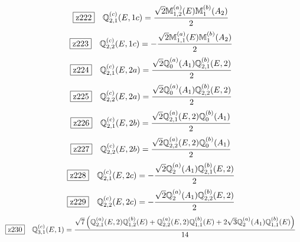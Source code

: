 \documentclass[fleqn,10pt,landscape]{jsarticle}
\begin{document}
\begin{dmath*}
\hspace*{3mm}\fbox{z222}\quad \mathbb{Q}_{2,1}^{(c)}(E,1c)=\frac{\sqrt{2} \mathbb{M}_{1,2}^{(a)}(E) \mathbb{M}_{1}^{(b)}(A_{2})}{2}
\end{dmath*}
\begin{dmath*}
\hspace*{3mm}\fbox{z223}\quad \mathbb{Q}_{2,2}^{(c)}(E,1c)=- \frac{\sqrt{2} \mathbb{M}_{1,1}^{(a)}(E) \mathbb{M}_{1}^{(b)}(A_{2})}{2}
\end{dmath*}
\begin{dmath*}
\hspace*{3mm}\fbox{z224}\quad \mathbb{Q}_{2,1}^{(c)}(E,2a)=\frac{\sqrt{2} \mathbb{Q}_{0}^{(a)}(A_{1}) \mathbb{Q}_{2,1}^{(b)}(E,2)}{2}
\end{dmath*}
\begin{dmath*}
\hspace*{3mm}\fbox{z225}\quad \mathbb{Q}_{2,2}^{(c)}(E,2a)=\frac{\sqrt{2} \mathbb{Q}_{0}^{(a)}(A_{1}) \mathbb{Q}_{2,2}^{(b)}(E,2)}{2}
\end{dmath*}
\begin{dmath*}
\hspace*{3mm}\fbox{z226}\quad \mathbb{Q}_{2,1}^{(c)}(E,2b)=\frac{\sqrt{2} \mathbb{Q}_{2,1}^{(a)}(E,2) \mathbb{Q}_{0}^{(b)}(A_{1})}{2}
\end{dmath*}
\begin{dmath*}
\hspace*{3mm}\fbox{z227}\quad \mathbb{Q}_{2,2}^{(c)}(E,2b)=\frac{\sqrt{2} \mathbb{Q}_{2,2}^{(a)}(E,2) \mathbb{Q}_{0}^{(b)}(A_{1})}{2}
\end{dmath*}
\begin{dmath*}
\hspace*{3mm}\fbox{z228}\quad \mathbb{Q}_{2,1}^{(c)}(E,2c)=- \frac{\sqrt{2} \mathbb{Q}_{2}^{(a)}(A_{1}) \mathbb{Q}_{2,1}^{(b)}(E,2)}{2}
\end{dmath*}
\begin{dmath*}
\hspace*{3mm}\fbox{z229}\quad \mathbb{Q}_{2,2}^{(c)}(E,2c)=- \frac{\sqrt{2} \mathbb{Q}_{2}^{(a)}(A_{1}) \mathbb{Q}_{2,2}^{(b)}(E,2)}{2}
\end{dmath*}
\begin{dmath*}
\hspace*{3mm}\fbox{z230}\quad \mathbb{Q}_{3,1}^{(c)}(E,1)=\frac{\sqrt{7} \left(\mathbb{Q}_{2,1}^{(a)}(E,2) \mathbb{Q}_{1,2}^{(b)}(E) + \mathbb{Q}_{2,2}^{(a)}(E,2) \mathbb{Q}_{1,1}^{(b)}(E) + 2 \sqrt{3} \mathbb{Q}_{2}^{(a)}(A_{1}) \mathbb{Q}_{1,1}^{(b)}(E)\right)}{14}
\end{dmath*}
\end{document}
